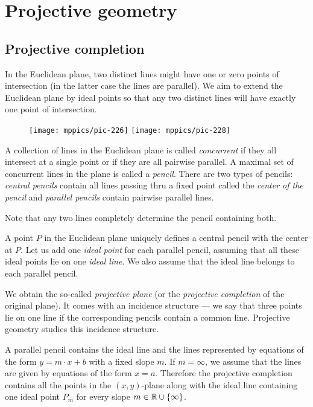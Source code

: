 \chapter{Projective geometry}\label{chap:proj}

\section{Projective completion}

In the Euclidean plane, two distinct lines might have one or zero points of intersection 
(in the latter case the lines are parallel).
We aim to extend the Euclidean plane by ideal points so that any two distinct lines will have exactly one point of intersection.

\begin{wrapfigure}{o}{31mm}
\centering
\texttt{[image: mppics/pic-226]}
\vskip4mm
\texttt{[image: mppics/pic-228]}
\end{wrapfigure}

A collection of lines in the Euclidean plane is called \emph{concurrent} if they all intersect at a single point 
or if they are all pairwise parallel.
A maximal set of concurrent lines in the plane is called a \emph{pencil}.
There are two types of pencils: 
\emph{central pencils} contain all lines passing thru a fixed point called the \emph{center of the pencil}
and  
\emph{parallel pencils} contain pairwise parallel lines.

Note that any two lines completely determine the pencil containing both.

A point $P$ in the Euclidean plane uniquely defines a central pencil with the center at $P$.
Let us add one \emph{ideal point} for each parallel pencil,
assuming that all these ideal points lie on one \emph{ideal line}.
We also assume that the ideal line belongs to each parallel pencil.

We obtain the so-called \emph{projective plane} (or  the \emph{projective completion} of the original plane). 
It comes with an incidence structure --- we say that three points lie on one line if the corresponding pencils contain a common line.
Projective geometry studies this incidence structure.

A parallel pencil contains the ideal line and the lines represented by equations of the form $y=m\cdot x+b$ with a fixed slope $m$.
If $m=\infty$, we assume that the lines are given by equations of the form $x=a$.
Therefore the projective completion contains all the points in the $(x,y)$-plane along with the ideal line containing one ideal point $P_m$ for every slope $m\in\mathbb{R}\cup\{\infty\}$.

